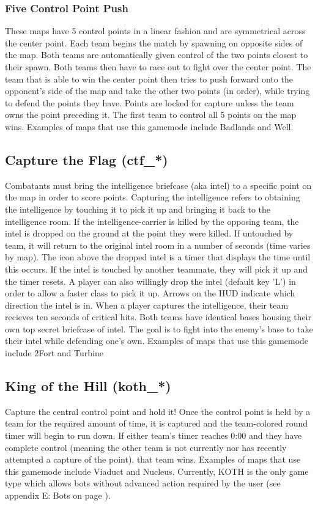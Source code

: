 \subsubsection{Five Control Point Push}
These maps have 5 control points in a linear fashion and are symmetrical across the center point. Each team begins the match by spawning on opposite sides of the map. Both teams are automatically given control of the two points closest to their spawn. Both teams then have to race out to fight over the center point. The team that is able to win the center point then tries to push forward onto the opponent's side of the map and take the other two points (in order), while trying to defend the points they have. Points are locked for capture unless the team owns the point preceding it. The first team to control all 5 points on the map wins. Examples of maps that use this gamemode include Badlands and Well.

\subsection{Capture the Flag (ctf\_*)}
Combatants must bring the intelligence briefcase (aka intel) to a specific point on the map in order to score points. Capturing the intelligence refers to obtaining the intelligence by touching it to pick it up and bringing it back to the intelligence room.  If the intelligence-carrier is killed by the opposing team, the intel is dropped on the ground at the point they were killed. If untouched by team, it will return to the original intel room in a number of seconds (time varies by map).  The icon above the dropped intel is a timer that displays the time until this occurs.  If the intel is touched by another teammate, they will pick it up and the timer resets. A player can also willingly drop the intel (default key 'L') in order to allow a faster class to pick it up. Arrows on the HUD indicate which direction the intel is in. When a player captures the intelligence, their team recieves ten seconds of critical hits. Both teams have identical bases housing their own top secret briefcase of intel.  The goal is to fight into the enemy's base to take their intel while defending one's own. Examples of maps that use this gamemode include 2Fort and Turbine

\subsection{King of the Hill (koth\_*)}
Capture the central control point and hold it!  Once the control point is held by a team for the required amount of time, it is captured and the team-colored round timer will begin to run down. If either team's timer reaches 0:00 and they have complete control (meaning the other team is not currently nor has recently attempted a capture of the point), that team wins. Examples of maps that use this gamemode include Viaduct and Nucleus. Currently, KOTH is the only game type which allows bots without advanced action required by the user (see appendix E: Bots on page \pageref{Bots}).

